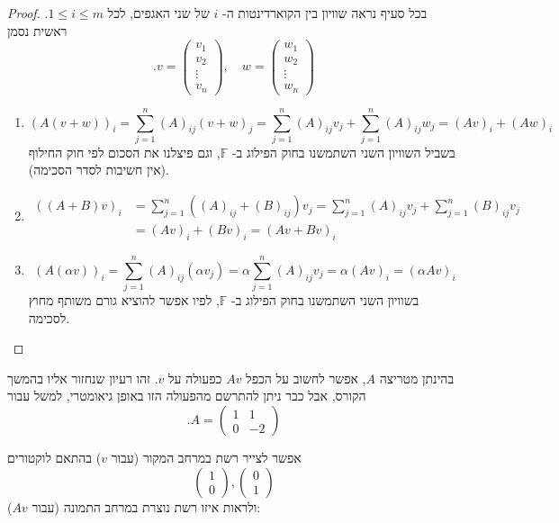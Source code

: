 \documentclass[12pt]{report}
\theoremstyle{plain}
\theoremstyle{definition}
\newcommand{\F}{\mathbb{F}}
\newcommand{\0}{\mathbf{0}}
\begin{document}
\begin{proof}
בכל סעיף נראה שוויון בין הקוארדינטות ה-
$i$
של שני האגפים, לכל
$1\leq i\leq m$. 
ראשית נסמן
$$
.v=\begin{pmatrix}
 v_1 \\
 v_2 \\
 \vdots \\
 v_n
 \end{pmatrix}, \quad 
 w=\begin{pmatrix}
 w_1 \\
 w_2 \\
 \vdots \\
 w_n 
 \end{pmatrix}
$$

\begin{enumerate}[label=\alph*.]
\item 
$$
(A(v+w))_i=\sum_{j=1}^n (A)_{ij}(v+w)_j=\sum_{j=1}^n (A)_{ij}v_j+\sum_{j=1}^n (A)_{ij}w_j=(Av)_i+(Aw)_i
$$
בשביל השוויון השני השתמשנו בחוק הפילוג ב-
$\F$, 
וגם פיצלנו את הסכום לפי חוק החילוף (אין חשיבות לסדר הסכימה).


\item 
$$
\begin{aligned}
((A+B)v)_i&=\sum_{j=1}^n ((A)_{ij}+(B)_{ij})v_j=\sum_{j=1}^n (A)_{ij}v_j+\sum_{j=1}^n (B)_{ij}v_j\\
&=(Av)_i+(Bv)_i=(Av+Bv)_i
\end{aligned}
$$


\item 
$$
(A(\alpha v))_i=\sum_{j=1}^n (A)_{ij}(\alpha v_j)=\alpha\sum_{j=1}^n (A)_{ij}v_j=\alpha(Av)_i=(\alpha Av)_i
$$
בשוויון השני השתמשנו בחוק הפילוג ב-
$\F$,
לפיו אפשר להוציא גורם משותף מחוץ לסכימה.

\end{enumerate}
\end{proof}

בהינתן מטריצה
$A$,
אפשר לחשוב על הכפל
$Av$
כפעולה על
$v$.
זהו רעיון שנחזור אליו בהמשך הקורס, אבל כבר ניתן להתרשם מהפעולה הזו באופן גיאומטרי, למשל עבור
$$
.A=\begin{pmatrix}
1 & 1 \\
0 & -2
\end{pmatrix}
$$

אפשר לצייר רשת במרחב המקור (עבור
$v$)
בהתאם לוקטורים
$$
\begin{pmatrix}1 \\
0 
\end{pmatrix}, \begin{pmatrix}0 \\
1
\end{pmatrix}
$$
ולראות איזו רשת נוצרת במרחב התמונה (עבור
$Av$):
\end{document}
